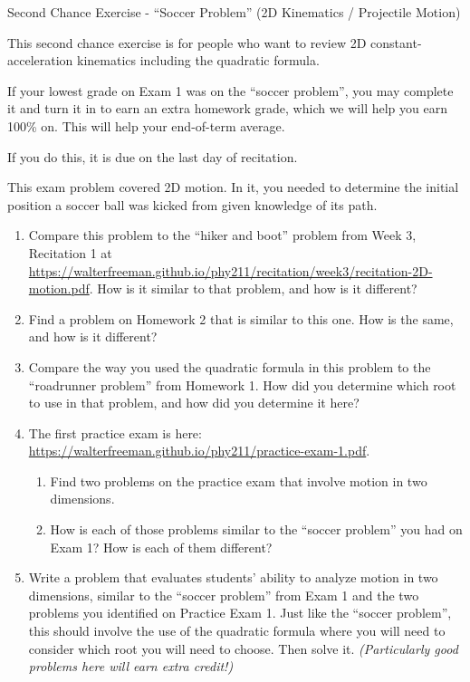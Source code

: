 \documentclass[12pt]{article}
\begin{document}
\begin{center}
\Large
\sc Second Chance Exercise - ``Soccer Problem'' (2D Kinematics / Projectile Motion)\rm





\normalsize
This second chance exercise is for people who want to review 2D constant-acceleration kinematics including the quadratic formula.

If your lowest grade on Exam 1 was on the ``soccer problem'', you may complete it and turn it in to earn an extra homework grade, which we will help you earn 100\% on. This will help your end-of-term average.

If you do this, it is due on the last day of recitation.

\end{center}

\vspace{1.5in}

This exam problem covered 2D motion. In it, you needed to determine the initial position a soccer ball was kicked from given knowledge of its path.

\begin{enumerate}
	\item Compare this problem to the ``hiker and boot'' problem from Week 3, Recitation 1 at \url{https://walterfreeman.github.io/phy211/recitation/week3/recitation-2D-motion.pdf}. How is it similar to that problem, and how is it different?
	
	\item Find a problem on Homework 2 that is similar to this one. How is the same, and how is it different?
	
	\item Compare the way you used the quadratic formula in this problem to the ``roadrunner problem'' from Homework 1. How did you determine which root to use in that problem, and how did you determine it here?
	
	\item The first practice exam is here: \url{https://walterfreeman.github.io/phy211/practice-exam-1.pdf}. 
	\begin{enumerate}
		\item Find two problems on the practice exam that involve motion in two dimensions.
		\item How is each of those problems similar to the ``soccer problem'' you had on Exam 1? How is each of them different?
	\end{enumerate}
    \item Write a problem that evaluates students' ability to analyze motion in two dimensions, similar to the ``soccer problem'' from Exam 1 and the two problems you identified on Practice Exam 1. Just like the ``soccer problem'', this should involve the use of the quadratic formula where you will need to consider which root you will need to choose. Then solve it. {\it (Particularly good problems here will earn extra credit!)}
\end{enumerate}
\end{document}

